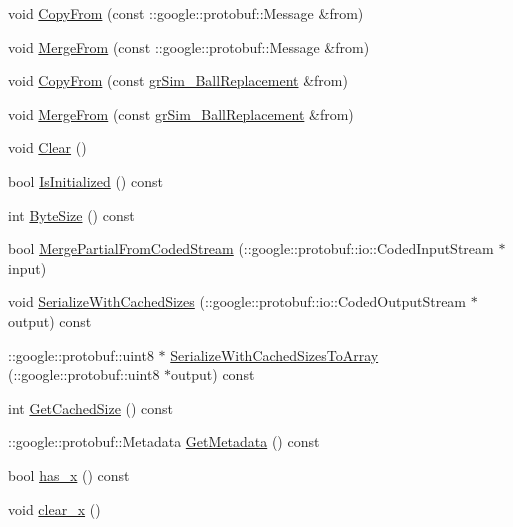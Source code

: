 \begin{DoxyCompactItemize}
\item 
void \hyperlink{classgr_sim___ball_replacement_acb0e72bd6ec59a0e28b18c39a13005f3}{Copy\-From} (const \-::google\-::protobuf\-::\-Message \&from)
\item 
void \hyperlink{classgr_sim___ball_replacement_a1cd288343e9f63b137f2c5ecb4fa183a}{Merge\-From} (const \-::google\-::protobuf\-::\-Message \&from)
\item 
void \hyperlink{classgr_sim___ball_replacement_abddd453ffd89783e47e606eeee47b169}{Copy\-From} (const \hyperlink{classgr_sim___ball_replacement}{gr\-Sim\-\_\-\-Ball\-Replacement} \&from)
\item 
void \hyperlink{classgr_sim___ball_replacement_a730b7fb1cfb785ce27595dffa3dbfb86}{Merge\-From} (const \hyperlink{classgr_sim___ball_replacement}{gr\-Sim\-\_\-\-Ball\-Replacement} \&from)
\item 
void \hyperlink{classgr_sim___ball_replacement_ab99a84ae6ba4313b089bc1c49553fd88}{Clear} ()
\item 
bool \hyperlink{classgr_sim___ball_replacement_a5f504bd332593746d68fbc0883291b98}{Is\-Initialized} () const 
\item 
int \hyperlink{classgr_sim___ball_replacement_a52ec47e688c2c7b75ab754ed67eb5251}{Byte\-Size} () const 
\item 
bool \hyperlink{classgr_sim___ball_replacement_aa85b2a85ca99bd4bd1b71bc6897784df}{Merge\-Partial\-From\-Coded\-Stream} (\-::google\-::protobuf\-::io\-::\-Coded\-Input\-Stream $\ast$input)
\item 
void \hyperlink{classgr_sim___ball_replacement_a6e55e4a08380a70e62f8a448d521b98e}{Serialize\-With\-Cached\-Sizes} (\-::google\-::protobuf\-::io\-::\-Coded\-Output\-Stream $\ast$output) const 
\item 
\-::google\-::protobuf\-::uint8 $\ast$ \hyperlink{classgr_sim___ball_replacement_aa7093b70f6575b96d63b4dba2fd55c2a}{Serialize\-With\-Cached\-Sizes\-To\-Array} (\-::google\-::protobuf\-::uint8 $\ast$output) const 
\item 
int \hyperlink{classgr_sim___ball_replacement_a764d77c5e23b844d3d42c8cccd5c6642}{Get\-Cached\-Size} () const 
\item 
\-::google\-::protobuf\-::\-Metadata \hyperlink{classgr_sim___ball_replacement_a5bf75f8520bf4db75849de82d8140db6}{Get\-Metadata} () const 
\item 
bool \hyperlink{classgr_sim___ball_replacement_a130b729e91eec4324588c75e168fecb2}{has\-\_\-x} () const 
\item 
void \hyperlink{classgr_sim___ball_replacement_a51a7045ad49a9bf5227438ad1dc2fb51}{clear\-\_\-x} ()

\end{DoxyCompactItemize}
